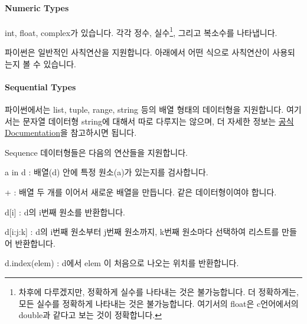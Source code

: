 \documentclass[titlepage]{report}
\begin{document}



\paragraph{Numeric Types} int, float, complex가 있습니다. 각각 정수, 실수\footnote{차후에 다루겠지만, 정확하게 실수를 나타내는 것은 불가능합니다. 더 정확하게는, 모든 실수를 정확하게 나타내는 것은 불가능합니다. 여기서의 float은 c언어에서의 double과 같다고 보는 것이 정확합니다.}, 그리고 복소수를 나타냅니다. 



파이썬은 일반적인 사칙연산을 지원합니다. 아래에서 어떤 식으로 사칙연산이 사용되는지 볼 수 있습니다. 




\paragraph{Sequential Types} 파이썬에서는 list, tuple, range, string 등의 배열 형태의 데이터형을 지원합니다. 여기서는 문자열 데이터형 string에 대해서 따로 다루지는 않으며, 더 자세한 정보는 \href{https://docs.python.org/3/library/stdtypes.html#sequence-types-list-tuple-range}{공식 Documentation}을 참고하시면 됩니다. 




Sequence 데이터형들은 다음의 연산들을 지원합니다. 
\begin{compactitem} 
\item a in d : 배열(d) 안에 특정 원소(a)가 있는지를 검사합니다. 
\item + : 배열 두 개를 이어서 새로운 배열을 만듭니다. 같은 데이터형이여야 합니다. 
\item d[i] : d의 i번째 원소를 반환합니다. 
\item d[i:j:k] : d의 i번째 원소부터 j번째 원소까지, k번째 원소마다 선택하여 리스트를 만들어 반환합니다. 
\item d.index(elem) : d에서 elem 이 처음으로 나오는 위치를 반환합니다. 
\end{compactitem}

\end{document}
